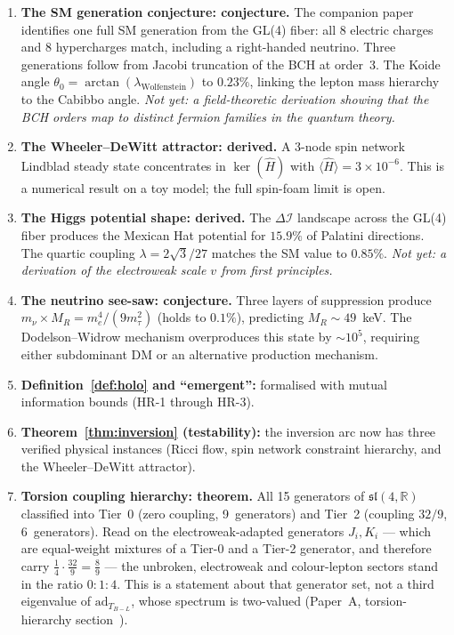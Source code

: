 \documentclass[11pt,a4paper]{article}
\theoremstyle{plain}
\theoremstyle{definition}
\theoremstyle{remark}
\newcommand{\DI}{\Delta\mathcal{I}}
\begin{document}
\begin{enumerate}[label=(\arabic*)]
  \item \textbf{The SM generation conjecture: conjecture.}
    The companion paper~\cite{Wallace2026a} identifies one full SM
    generation from the GL(4) fiber: all 8 electric charges and
    8 hypercharges match, including a right-handed neutrino.
    Three generations follow from Jacobi truncation of the BCH at order~3.
    The Koide angle $\theta_0 = \arctan(\lambda_{\mathrm{Wolfenstein}})$
    to $0.23\%$, linking the lepton mass hierarchy to the Cabibbo angle.
    \emph{Not yet: a field-theoretic derivation showing that the BCH
    orders map to distinct fermion families in the quantum theory.}

  \item \textbf{The Wheeler--DeWitt attractor: derived.}
    A 3-node spin network Lindblad steady state concentrates in
    $\ker(\hat{H})$ with $\langle\hat{H}\rangle = 3 \times 10^{-6}$.
    This is a numerical result on a toy model; the full spin-foam
    limit is open.

  \item \textbf{The Higgs potential shape: derived.}
    The $\DI$ landscape across the GL(4) fiber produces the Mexican Hat
    potential for $15.9\%$ of Palatini directions.  The quartic coupling
    $\lambda = 2\sqrt{3}/27$ matches the SM value to $0.85\%$.
    \emph{Not yet: a derivation of the electroweak scale $v$ from
    first principles.}

  \item \textbf{The neutrino see-saw: conjecture.}
    Three layers of suppression produce $m_\nu \times M_R = m_e^4/(9m_\tau^2)$
    (holds to $0.1\%$), predicting $M_R \sim 49$~keV.
    The Dodelson--Widrow mechanism overproduces this state by $\sim\!10^5$,
    requiring either subdominant DM or an alternative production mechanism.

  \item \textbf{Definition~\ref{def:holo} and ``emergent'':} formalised
    with mutual information bounds (HR-1 through HR-3).

  \item \textbf{Theorem~\ref{thm:inversion} (testability):} the inversion
    arc now has three verified physical instances (Ricci flow, spin network
    constraint hierarchy, and the Wheeler--DeWitt attractor).

  \item \textbf{Torsion coupling hierarchy: theorem.}
    All 15 generators of $\mathfrak{sl}(4,\mathbb{R})$ classified into
    Tier~0 (zero coupling, 9~generators) and Tier~2 (coupling $32/9$,
    6~generators).  Read on the electroweak-adapted generators $J_i, K_i$
    --- which are equal-weight mixtures of a Tier-0 and a Tier-2 generator,
    and therefore carry $\tfrac14\cdot\tfrac{32}{9} = \tfrac89$ --- the
    unbroken, electroweak and colour-lepton sectors stand in the ratio
    $0{:}1{:}4$.  This is a statement about that generator set, not a third
    eigenvalue of $\mathrm{ad}_{T_{B{-}L}}$, whose spectrum is two-valued
    (Paper~A, torsion-hierarchy section~\cite{Wallace2026a}).


\end{enumerate}
\end{document}
